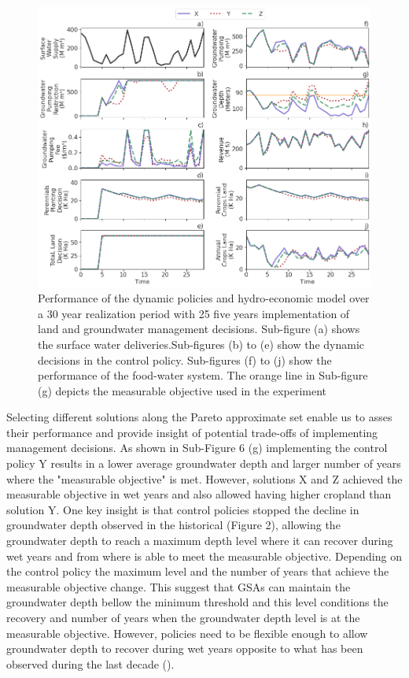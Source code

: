 \documentclass[11pt,a4paper]{article}
\begin{document}
\begin{figure}[H]
    \centering
    \includegraphics[width=1\textwidth]{selected_policies_performance.png}
    \caption{Performance of the dynamic policies and hydro-economic model over a 30 year realization period with 25 five years implementation of land and groundwater management decisions. Sub-figure (a) shows the surface water deliveries.Sub-figures (b) to (e) show the dynamic decisions in the control policy. Sub-figures (f) to (j) show the performance of the food-water system. The orange line in Sub-figure (g) depicts the measurable objective used in the experiment} \label{fig:parallel_robustness}
\end{figure}

Selecting different solutions along the Pareto approximate set enable us to asses their performance and provide insight of potential trade-offs of implementing management decisions. As shown in Sub-Figure 6 (g) implementing the control policy Y results in a lower average groundwater depth and larger number of years where the "measurable objective" is met. However, solutions X and Z achieved the measurable objective in wet years and also allowed having higher cropland than solution Y. 
One key insight is that control policies stopped the decline in groundwater depth observed in the historical (Figure 2), allowing the groundwater depth to reach a maximum depth level where it can recover during wet years and from where is able to meet the measurable objective. Depending on the control policy the maximum level and the number of years that achieve the measurable objective change. This suggest that GSAs can maintain the groundwater depth bellow the minimum threshold and this level conditions the recovery and number of years when the groundwater depth level is at the measurable objective. However, policies need to be flexible enough to allow groundwater depth to recover during wet years opposite to what has been observed during the last decade (\cite{liu_groundwater_2022}).
\end{document}
